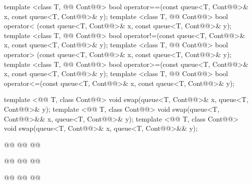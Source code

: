 \documentclass[american,twoside]{book}
\begin{document}
\begin{codeblock}
{  template <class T, @@ Cont@@>
    bool operator==(const queue<T, Cont@@>& x, const queue<T, Cont@@>& y);
  template <class T, @@ Cont@@>
    bool operator< (const queue<T, Cont@@>& x, const queue<T, Cont@@>& y);
  template <class T, @@ Cont@@>
    bool operator!=(const queue<T, Cont@@>& x, const queue<T, Cont@@>& y);
  template <class T, @@ Cont@@>
    bool operator> (const queue<T, Cont@@>& x, const queue<T, Cont@@>& y);
  template <class T, @@ Cont@@>
    bool operator>=(const queue<T, Cont@@>& x, const queue<T, Cont@@>& y);
  template <class T, @@ Cont@@>
    bool operator<=(const queue<T, Cont@@>& x, const queue<T, Cont@@>& y);

  template <@@ T, class Cont@@>
    void swap(queue<T, Cont@@>& x, queue<T, Cont@@>& y);
  template <@@ T, class Cont@@>
    void swap(queue<T, Cont@@>&& x, queue<T, Cont@@>& y);
  template <@@ T, class Cont@@>
    void swap(queue<T, Cont@@>& x, queue<T, Cont@@>&& y);

  @@
    @@
    @@

  @@
    @@
      @@

  @@
    @@
      @@
}
\end{codeblock}
\end{document}
